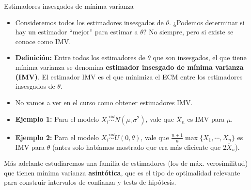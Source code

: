 \documentclass{beamer}
\theoremstyle{definition}
\begin{document}
\begin{frame}{\color{rosee}Estimadores insesgados de m\'inima varianza} \small

\begin{itemize}
    \item Consideremos todos los estimadores insesgados de $\theta$. ¿Podemos determinar si hay un estimador ``mejor'' para estimar a $\theta$? No siempre, pero si existe se conoce como IMV. 
  \item \textbf{Definición:} Entre todos los estimadores de $\theta$ que son insesgados, el que
    tiene m\'inima varianza se denomina \textbf{estimador insesgado de
      m\'inima varianza (IMV)}. El estimador IMV es el que minimiza el ECM entre los estimadores insesgados de $\theta$.
\item  No vamos a ver en el curso como obtener estimadores IMV.
  \item \textbf{Ejemplo 1:} Para el modelo $X_i\stackrel{iid}{\sim}N(\mu,\sigma^2)$, vale que $\overline{X}_n$ es IMV para $\mu$.
  \item \textbf{Ejemplo 2:} Para el modelo $X_i\stackrel{iid}{\sim}U(0,\theta)$, vale que $\frac{n+1}{n}\max\{X_1,\cdots, X_n\}$ es IMV para $\theta$ (antes solo hab\'iamos mostrado que era m\'as
    eficiente que $2\overline{X}_{n}$).
\end{itemize}
Más adelante estudiaremos una familia de estimadores (los de máx. verosimilitud) que tienen mínima
varianza \textbf{asintótica}, que es el tipo de optimalidad relevante
para construir intervalos de confianza y tests de hipótesis.

\end{frame}
\end{document}

